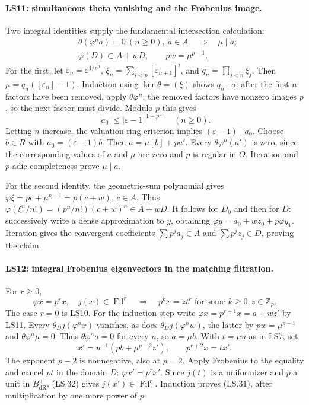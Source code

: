 \paragraph{LS11: simultaneous theta vanishing and the Frobenius image.}
Two integral identities supply the fundamental intersection calculation:
\[
 \begin{split}
 &\theta(\varphi^na)=0\ (n\ge0),\ a\in A
                              \quad\Longrightarrow\quad \mu\mid a;\\
 &\varphi(D)\subset A+wD,
                 \qquad pw=\mu^{p-1}.
 \end{split}                                                   \tag{LS.30}
\]
For the first, let $\varepsilon_n=\varepsilon^{1/p^n}$,
$\xi_n=\sum_{i<p}[\varepsilon_{n+1}]^i$, and
$q_n=\prod_{j<n}\xi_j$. Then
$\mu=q_n([\varepsilon_n]-1)$.
Induction using $\ker\theta=(\xi)$ shows $q_n\mid a$:
after the first $n$ factors have been removed, apply $\theta\varphi^n$;
the removed factors have nonzero images $p$, so the next factor
must divide. Modulo $p$ this gives
\[
 |a_0|\le|\varepsilon-1|^{\,1-p^{-n}}\quad(n\ge0).
\]
Letting $n$ increase, the valuation-ring criterion implies
$(\varepsilon-1)\mid a_0$. Choose $b\in R$ with
$a_0=(\varepsilon-1)b$. Then $a=\mu[b]+pa'$.
Every $\theta\varphi^n(a')$ is zero, since the corresponding
values of $a$ and $\mu$ are zero and $p$ is regular in $O$.
Iteration and $p$-adic completeness prove $\mu\mid a$.

For the second identity, the geometric-sum polynomial gives
$\varphi\xi=pc+\mu^{p-1}=p(c+w)$, $c\in A$.
Thus
$\varphi(\xi^n/n!)=(p^n/n!)(c+w)^n\in A+wD$.
It follows for $D_0$ and then for $D$: successively write a dense
approximation to $y$, obtaining
$\varphi y=a_0+wz_0+p\varphi y_1$.
Iteration gives the convergent coefficients
$\sum p^ja_j\in A$ and $\sum p^jz_j\in D$, proving the claim.

\paragraph{LS12: integral Frobenius eigenvectors in the matching filtration.}
For $r\ge0$,
\[
 \varphi x=p^r x,\quad j(x)\in\operatorname{Fil}^r
 \quad\Longrightarrow\quad
 p^k x=z t^r\text{ for some }k\ge0, z\in\mathbb Z_p.
 \tag{LS.31}
\]
The case $r=0$ is LS10. For the induction step write
$\varphi x=p^{r+1}x=a+wz'$ by LS11. Every
$\theta_Dj(\varphi^n x)$ vanishes, as does
$\theta_Dj(\varphi^n w)$, the latter by
$p w=\mu^{p-1}$ and $\theta\varphi^n\mu=0$.
Thus $\theta\varphi^n a=0$ for every $n$, so $a=\mu b$.
With $t=\mu u$ as in LS7, set
\[
 x'=u^{-1}(pb+\mu^{p-2}z'),\qquad
                         p^{r+2}x=t x'.             \tag{LS.32}
\]
The exponent $p-2$ is nonnegative, also at $p=2$.
Apply Frobenius to the equality and cancel $pt$ in the domain $D$:
$\varphi x'=p^r x'$. Since $j(t)$ is a uniformizer and $p$ a
unit in $B_{\mathrm{dR}}^+$, (LS.32) gives
$j(x')\in\operatorname{Fil}^r$. Induction proves (LS.31), after
multiplication by one more power of $p$.

